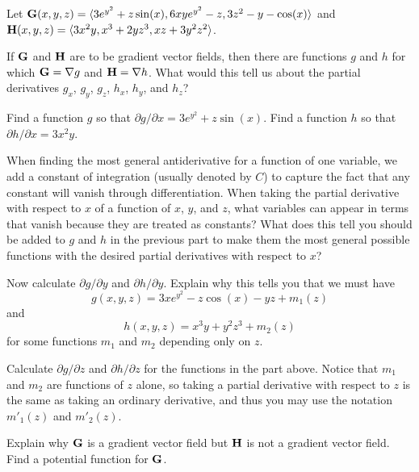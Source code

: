 \begin{pa}
Let $\mathbf{G}(x,y,z) = \langle 3e^{y^2}+z\sin(x),6xy e^{y^2} -
  z,3z^2-y-\cos(x)\rangle$ and $\mathbf{H}(x,y,z) = \langle 3x^2 y,x^3+2yz^3,xz+3y^2z^2\rangle$.
\ba
\restoreCount
\item If $\mathbf{G}$ and $\mathbf{H}$ are to be gradient vector fields, then there
  are functions $g$ and $h$ for which $\mathbf{G} = \nabla g$ and $\mathbf{H}=\nabla
  h$. What would this tell us about the partial derivatives $g_x$,
  $g_y$, $g_z$, $h_x$, $h_y$, and $h_z$?
\item Find a function $g$ so that $\partial g/\partial x =
  3e^{y^2}+z\sin(x)$. Find a function $h$ so that $\partial
  h/\partial x = 3x^2y$.
\item When finding the most general antiderivative for a function of
  one variable, we add a constant of integration (usually denoted by
  $C$) to capture the fact that any constant will vanish through
  differentiation. When taking the partial derivative with respect to
  $x$ of a function of
  $x$, $y$, and $z$, what variables can appear in terms that vanish
  because they are treated as constants? What does this tell you
  should be added to $g$ and $h$ in the previous part to make them
  the most general possible functions with the desired partial
  derivatives with respect to $x$?
\item Now calculate $\partial g/\partial y$ and $\partial
  h/\partial y$. Explain why this tells you that we must have
  \[g(x,y,z) = 3xe^{y^2}-z\cos(x)-yz+m_1(z)\]
  and
  \[h(x,y,z) = x^3y+y^2z^3+m_2(z)\]
  for some functions $m_1$ and $m_2$ depending only on $z$.
\item Calculate $\partial g/\partial z$ and $\partial h/\partial z$
  for the functions in the part above. Notice that $m_1$ and $m_2$ are
  functions of $z$ alone, so taking a partial derivative with respect
  to $z$ is the same as taking an ordinary derivative, and thus you
  may use the notation $m'_1(z)$ and $m'_2(z)$.
\item Explain why $\mathbf{G}$ is a gradient vector field but $\mathbf{H}$ is not a
  gradient vector field. Find a potential function for $\mathbf{G}$.
\ea
\end{pa} 
\afterpa 
